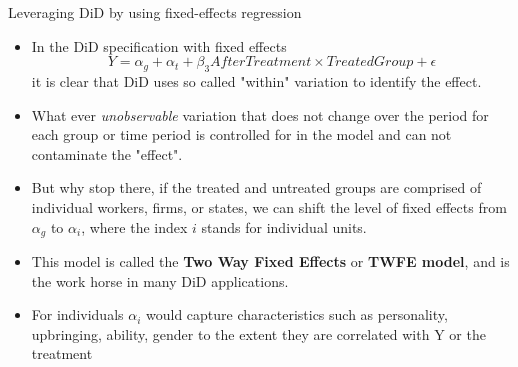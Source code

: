 \documentclass[notes,11pt, aspectratio=169]{beamer}
\begin{document}
\begin{frame}{Leveraging DiD by using fixed-effects regression}
\begin{itemize}
\item In the DiD specification with fixed effects 
\begin{equation}
Y = \alpha_g + \alpha_{t} + \beta_3 AfterTreatment \times TreatedGroup + \epsilon
\end{equation}
it is clear that DiD uses so called "within" variation to identify the effect. 
\item What ever \emph{unobservable} variation that does not change over the period for each group or time period is controlled for in the model and can not contaminate the "effect".    
\item But why stop there, if the treated and untreated groups are comprised of individual workers, firms, or states, we can shift the level of fixed effects from $\alpha_g$ to $\alpha_i$, where the index $i$ stands for individual units.  
\item This model is called the \textbf{Two Way Fixed Effects} or \textbf{TWFE model}, and is the work horse in many DiD applications.
\item For individuals $\alpha_i$ would capture characteristics such as personality, upbringing, ability, gender to the extent they are correlated with Y or the treatment
\end{itemize}
\end{frame}
\end{document}
